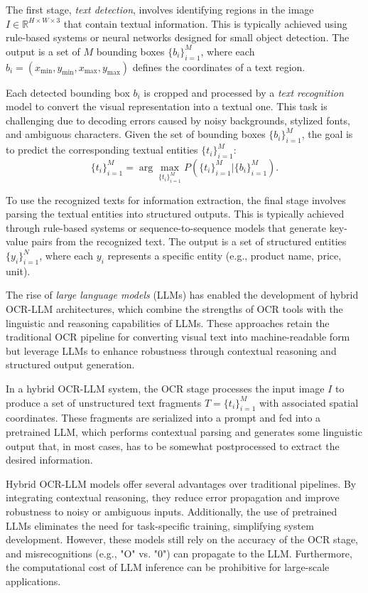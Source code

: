 \documentclass[11pt]{article}
\begin{document}
The first stage, \emph{text detection}, involves identifying regions in the image $ I \in \mathbb{R}^{H \times W \times 3} $ that contain textual information. This is typically achieved using rule-based systems or neural networks designed for small object detection. The output is a set of $ M $ bounding boxes $ \{b_i\}_{i=1}^{M} $, where each $ b_i = (x_{\text{min}}, y_{\text{min}}, x_{\text{max}}, y_{\text{max}}) $ defines the coordinates of a text region. 

Each detected bounding box $ b_i $ is cropped and processed by a \emph{text recognition} model to convert the visual representation into a textual one. This task is challenging due to decoding errors caused by noisy backgrounds, stylized fonts, and ambiguous characters. Given the set of bounding boxes $ \{b_i\}_{i=1}^{M} $, the goal is to predict the corresponding textual entities $ \{t_i\}_{i=1}^{M} $:  
\begin{equation}
\{t_i\}_{i=1}^{M} = \arg\max_{\{t_i\}_{i=1}^{M}} P(\{t_i\}_{i=1}^{M} | \{b_i\}_{i=1}^{M}).
\end{equation}  

To use the recognized texts for information extraction, the final stage involves parsing the textual entities into structured outputs. This is typically achieved through rule-based systems or sequence-to-sequence models that generate key-value pairs from the recognized text. The output is a set of structured entities $ \{y_i\}_{i=1}^{N} $, where each $ y_i $ represents a specific entity (e.g., product name, price, unit).

The rise of \emph{large language models }(LLMs) has enabled the development of hybrid OCR-LLM architectures, which combine the strengths of OCR tools with the linguistic and reasoning capabilities of LLMs. These approaches retain the traditional OCR pipeline for converting visual text into machine-readable form but leverage LLMs to enhance robustness through contextual reasoning and structured output generation.

In a hybrid OCR-LLM system, the OCR stage processes the input image $ I $ to produce a set of unstructured text fragments $ T = \{t_i\}_{i=1}^{M} $ with associated spatial coordinates. These fragments are serialized into a prompt and fed into a pretrained LLM, which performs contextual parsing and generates some linguistic output that, in most cases, has to be somewhat postprocessed to extract the desired information.

Hybrid OCR-LLM models offer several advantages over traditional pipelines. By integrating contextual reasoning, they reduce error propagation and improve robustness to noisy or ambiguous inputs. Additionally, the use of pretrained LLMs eliminates the need for task-specific training, simplifying system development. However, these models still rely on the accuracy of the OCR stage, and misrecognitions (e.g., "O" vs. "0") can propagate to the LLM. Furthermore, the computational cost of LLM inference can be prohibitive for large-scale applications.
\end{document}
